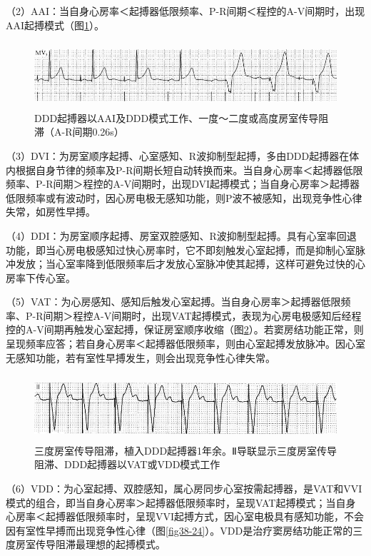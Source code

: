 （2）AAI：当自身心房率＜起搏器低限频率、P-R间期＜程控的A-V间期时，出现AAI起搏模式（图\ref{fig38-22}）。

\begin{figure}[!htbp]
 \centering
 \includegraphics[width=5.58333in,height=0.95833in]{./images/Image00625.jpg}
 \captionsetup{justification=centering}
 \caption{DDD起搏器以AAI及DDD模式工作、一度～二度或高度房室传导阻滞（A-R间期0.26s）}
 \label{fig38-22}
  \end{figure} 

（3）DVI：为房室顺序起搏、心室感知、R波抑制型起搏，多由DDD起搏器在体内根据自身节律的频率及P-R间期长短自动转换而来。当自身心房率＜起搏器低限频率、P-R间期＞程控的A-V间期时，出现DVI起搏模式；当自身心房率＞起搏器低限频率或有波动时，因心房电极无感知功能，则P波不被感知，出现竞争性心律失常，如房性早搏。

（4）DDI：为房室顺序起搏、房室双腔感知、R波抑制型起搏。具有心室率回退功能，即当心房电极感知过快心房率时，它不即刻触发心室起搏，而是抑制心室脉冲发放；当心室率降到低限频率后才发放心室脉冲使其起搏，这样可避免过快的心房率下传心室。

（5）VAT：为心房感知、感知后触发心室起搏。当自身心房率＞起搏器低限频率、P-R间期＞程控A-V间期时，出现VAT起搏模式，表现为心房电极感知后经程控的A-V间期再触发心室起搏，保证房室顺序收缩（图\ref{fig38-23}）。若窦房结功能正常，则呈现频率应答；若自身心房率＜起搏器低限频率，则由心室起搏发放脉冲。因心室无感知功能，若有室性早搏发生，则会出现竞争性心律失常。

\begin{figure}[!htbp]
 \centering
 \includegraphics[width=5.58333in,height=0.95833in]{./images/Image00626.jpg}
 \captionsetup{justification=centering}
 \caption{三度房室传导阻滞，植入DDD起搏器1年余。Ⅱ导联显示三度房室传导阻滞、DDD起搏器以VAT或VDD模式工作}
 \label{fig38-23}
  \end{figure} 

（6）VDD：为心室起搏、双腔感知，属心房同步心室按需起搏器，是VAT和VVI模式的组合，即当自身心房率＞起搏器低限频率时，呈现VAT起搏模式；当自身心房率＜起搏器低限频率时，呈现VVI起搏方式，因心室电极具有感知功能，不会因有室性早搏而出现竞争性心律（图\ref{fig38-24}）。VDD是治疗窦房结功能正常的三度房室传导阻滞最理想的起搏模式。

